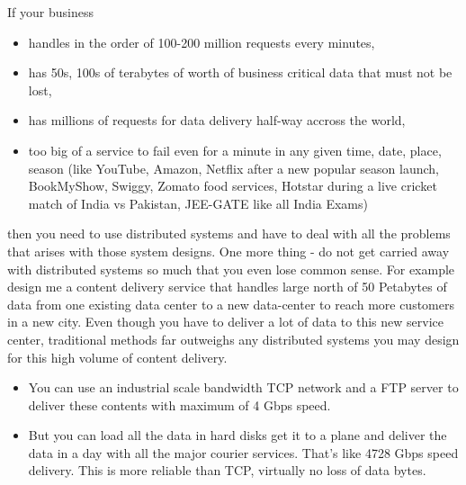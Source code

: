 \noindent If your business 
\begin{itemize}
    \item handles in the order of 100-200 million requests every minutes,
    \item has 50s, 100s of terabytes of worth of business critical data that must not be lost,
    \item has millions of requests for data delivery half-way accross the world,
    \item too big of a service to fail even for a minute in any given time, date, place, season (like YouTube, Amazon, Netflix after a new popular season launch, BookMyShow, Swiggy, Zomato food services, Hotstar during a live cricket match of India vs Pakistan, JEE-GATE like all India Exams)
\end{itemize}
then you need to use distributed systems and have to deal with all the problems that arises with those system designs. One more thing - do not get carried away with distributed systems so much that you even lose common sense. For example design me a content delivery service that handles large north of 50 Petabytes of data from one existing data center to a new data-center to reach more customers in a new city. Even though you have to deliver a lot of data to this new service center, traditional methods far outweighs any distributed systems you may design for this high volume of content delivery.

\begin{itemize}
    \item You can use an industrial scale bandwidth TCP network and a FTP server to deliver these contents with maximum of 4 Gbps speed.
    \item But you can load all the data in hard disks get it to a plane and deliver the data in a day with all the major courier services. That's like 4728 Gbps speed delivery. This is more reliable than TCP, virtually no loss of data bytes.
\end{itemize}